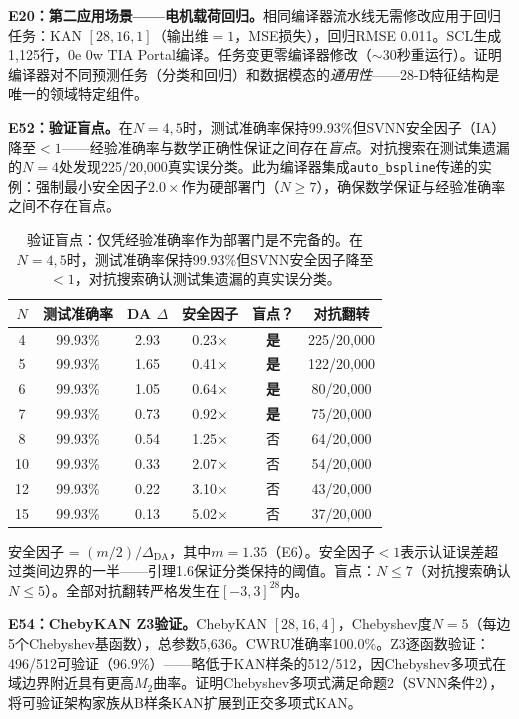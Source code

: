\documentclass[journal,onecolumn]{IEEEtran}
\theoremstyle{definition}
\theoremstyle{plain}
\theoremstyle{remark}
\begin{document}
\noindent\textbf{E20：第二应用场景——电机载荷回归。}相同编译器流水线无需修改应用于回归任务：KAN $[28,16,1]$（输出维$=1$，MSE损失），回归RMSE 0.011。SCL生成1,125行，0e 0w TIA Portal编译。任务变更零编译器修改（$\sim$30秒重运行）。证明编译器对不同预测任务（分类和回归）和数据模态的\textit{通用性}——28-D特征结构是唯一的领域特定组件。

\noindent\textbf{E52：验证盲点。}在$N=4,5$时，测试准确率保持99.93\%但SVNN安全因子（IA）降至$<1$——经验准确率与数学正确性保证之间存在\textit{盲点}。对抗搜索在测试集遗漏的$N=4$处发现225/20,000真实误分类。此为编译器集成\texttt{auto\_bspline}传递的实例：强制最小安全因子$2.0\times$作为硬部署门（$N \geq 7$），确保数学保证与经验准确率之间不存在盲点。

\begin{table}[!t]
\centering
\caption{验证盲点：仅凭经验准确率作为部署门是不完备的。在$N=4,5$时，测试准确率保持99.93\%但SVNN安全因子降至$<1$，对抗搜索确认测试集遗漏的真实误分类。}
\label{tab:blind_spot}
\footnotesize
\begin{tabular}{@{}cccccc@{}}
\toprule
\textbf{$N$} & \textbf{测试准确率} & \textbf{DA $\Delta$} & \textbf{安全因子} & \textbf{盲点？} & \textbf{对抗翻转} \\
\midrule
4  & 99.93\% & 2.93  & 0.23$\times$ & \textbf{是} & 225/20,000 \\
5  & 99.93\% & 1.65  & 0.41$\times$ & \textbf{是} & 122/20,000 \\
6  & 99.93\% & 1.05  & 0.64$\times$ & \textbf{是} & 80/20,000 \\
7  & 99.93\% & 0.73  & 0.92$\times$ & \textbf{是} & 75/20,000 \\
8  & 99.93\% & 0.54  & 1.25$\times$ & 否 & 64/20,000 \\
10 & 99.93\% & 0.33  & 2.07$\times$ & 否 & 54/20,000 \\
12 & 99.93\% & 0.22  & 3.10$\times$ & 否 & 43/20,000 \\
15 & 99.93\% & 0.13  & 5.02$\times$ & 否 & 37/20,000 \\
\bottomrule
\end{tabular}
\vspace{2pt}
{\scriptsize 安全因子 = $(m/2)/\Delta_{\text{DA}}$，其中$m=1.35$（E6）。安全因子$<1$表示认证误差超过类间边界的一半——引理1.6保证分类保持的阈值。盲点：$N \leq 7$（对抗搜索确认$N \leq 5$）。全部对抗翻转严格发生在$[-3,3]^{28}$内。}
\end{table}

\noindent\textbf{E54：ChebyKAN Z3验证。}ChebyKAN $[28,16,4]$，Chebyshev度$N=5$（每边5个Chebyshev基函数），总参数5,636。CWRU准确率100.0\%。Z3逐函数验证：496/512可验证（96.9\%）——略低于KAN样条的512/512，因Chebyshev多项式在域边界附近具有更高$M_2$曲率。证明Chebyshev多项式满足命题2（SVNN条件2），将可验证架构家族从B样条KAN扩展到正交多项式KAN。
\end{document}
